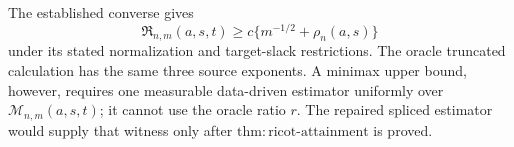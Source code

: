 The established converse gives
\[
\mathfrak R_{n,m}(a,s,t)\ge c\{m^{-1/2}+\rho_n(a,s)\}
\]
under its stated normalization and target-slack restrictions. The oracle truncated calculation has the same three source exponents. A minimax upper bound, however, requires one measurable data-driven estimator uniformly over \(\mathcal M_{n,m}(a,s,t)\); it cannot use the oracle ratio \(r\). The repaired spliced estimator would supply that witness only after \(\mathrm{thm:ricot\text{-}attainment}\) is proved.